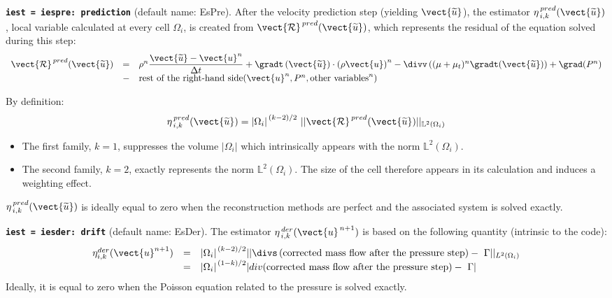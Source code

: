 {\tt \bf iest = iespre: prediction} (default name: EsPre).
After the velocity prediction step (yielding $\vect{\widetilde{u}}$), the
estimator $\eta^{\,pred}_{\,i,k}(\vect{\widetilde{u}})$, local variable calculated
at every cell $\Omega_i$, is created from $\vect{\mathcal
R}^{\,pred}(\vect{\widetilde{u}})$, which represents the residual of the equation
solved during this step:
\begin{equation*}
\begin{array}{r c l}
\vect{\mathcal{R}}^{\,pred}(\vect{\widetilde{u}})&= & \rho^n
    \dfrac{\vect{\widetilde{u}}-\vect{u}^n}{\Delta t}
  + \gradt \left(\vect{\widetilde{u}} \right) \cdot \left(\rho  \vect{u}\right)^n
              - \divv \left((\mu+\mu_t)^n \gradt(\vect{\widetilde{u}}) \right)
              + \grad(P^n)     \\
              &- &\text{rest of the right-hand side}
                        (\vect{u}^n, P^n, \text{other variables}^n)
\end{array}
\end{equation*}

By definition:
$$ \eta^{\,pred}_{\,i,k}(\vect{\widetilde{u}})= {|\Omega_i|}^{\,(k-2)/2}\ ||\vect{\mathcal R}^{\,pred}(\vect{\widetilde{u}})||
_{{\mathbb{L}}^{2}(\Omega_i)}$$
%
\begin{itemize}
\item The first family, $k=1$, suppresses the
volume $|\Omega_i|$ which intrinsically appears with the norm
${{\mathbb{L}}^{2}(\Omega_i)}$.
\item The second family, $k=2$, exactly represents the norm
${{\mathbb{L}}^{2}(\Omega_i)}$. The size of the cell therefore
appears in its calculation and induces a weighting effect.
\end{itemize}
$ \eta^{\,pred}_{\,i,k}(\vect{\widetilde{u}})$  is ideally equal to zero when the
reconstruction methods are perfect and the associated system is
solved exactly.

{\tt \bf iest = iesder: drift}  (default name: EsDer).
The estimator $\eta^{\,der}_{\,i,k}(\vect{u}^{\,n+1})$ is based on the
following quantity (intrinsic to the code):
\begin{equation}
\begin{array}{lll}
 \eta^{der}_{i,k}(\vect{u}^{n+1})
&=& {|\Omega_i|}^{\,(k-2)/2}
||\divs \left(\text{corrected mass flow after the pressure step}\right)
                                              -\ \Gamma||_{{L}^{2}(\Omega_i)} \\
&=& {|\Omega_i|}^{\,(1-k)/2}
|div (\text{corrected mass flow after the pressure step})-\ \Gamma|
\end{array}
\end{equation}
Ideally, it is equal to zero when the Poisson equation related to the pressure is
solved exactly.

